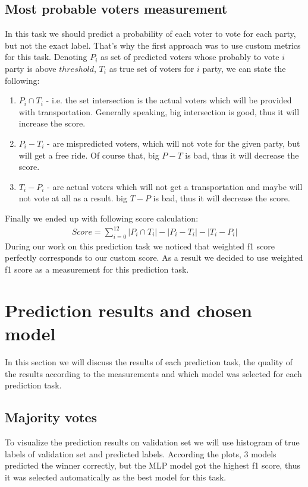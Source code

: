 \documentclass[12pt]{article}
\begin{document}
\subsection{Most probable voters measurement}
In this task we should predict a probability of each voter to vote for each party, but not the exact label. That's why the first approach was to use custom metrics for this task. Denoting $P_i$ as set of predicted voters whose probably to vote $i$ party is above $threshold$, $T_i$ as true set of voters for $i$ party, we can state the following:
\begin{enumerate}
	\item $P_i \cap T_i$ - i.e. the set intersection is the actual voters which will be provided with transportation. Generally speaking, big intersection is good, thus it will increase the score.
	\item $P_i - T_i$ - are mispredicted voters, which will not vote for the given party, but will get a free ride. Of course that, big $P-T$ is bad, thus it will decrease the score.
	\item $T_i - P_i$ - are actual voters which will not get a transportation and maybe will not vote at all as a result. big $T-P$ is bad, thus it will decrease the score.
\end{enumerate} 
Finally we ended up with following score calculation:\\
\begin{gather*}   
   Score = \sum_{i=0}^{12} |P_i \cap T_i|-|P_i - T_i|-|T_i -P_i|  
\end{gather*}
During our work on this prediction task we noticed that weighted f1 score perfectly corresponds to our custom score. As a result we decided to use weighted f1 score as a measurement for this prediction task. 


\section{Prediction results and chosen model}
In this section we will discuss the results of each prediction task, the quality of the results according to the measurements and which model was selected for each prediction task.
\subsection{Majority votes}
To visualize the prediction results on validation set we will use histogram of true labels of validation set and predicted labels. According the plots, 3 models predicted the winner correctly, but the MLP model got the highest f1 score, thus it was selected automatically as the best model for this task.
\end{document}
